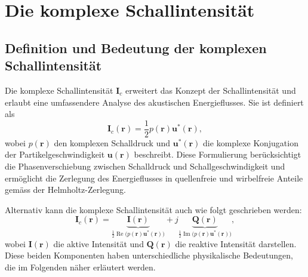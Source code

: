%
%
%
%
\section{Die komplexe Schallintensität
\label{helmholtz:section:Schallintensitaet}}

\subsection{Definition und Bedeutung der komplexen Schallintensität
\label{helmholtz:subsection:def_Schallintensitaet}}

Die komplexe Schallintensität $\boldsymbol{I}_c$ erweitert das
Konzept der Schallintensität und erlaubt eine umfassendere Analyse
des akustischen Energieflusses.
Sie ist definiert als
\begin{equation}
\boldsymbol{I}_c (\boldsymbol{r})
=
\frac{1}{2} p(\boldsymbol{r}) \boldsymbol{u}^{*}(\boldsymbol{r}),
\label{helmholtz:equationIntensitaetKomplex}
\end{equation}
wobei $p(\boldsymbol{r})$ den komplexen Schalldruck und
$\boldsymbol{u}^{*}(\boldsymbol{r})$ die komplexe Konjugation der
Partikelgeschwindigkeit $\boldsymbol{u}(\boldsymbol{r})$ beschreibt.
Diese Formulierung berücksichtigt die Phasenverschiebung zwischen
Schalldruck und Schallgeschwindigkeit und ermöglicht die Zerlegung
des Energieflusses in quellenfreie und wirbelfreie Anteile gemäss
der Helmholtz-Zerlegung.

Alternativ kann die komplexe Schallintensität auch wie folgt geschrieben werden:
\begin{equation}
\boldsymbol{I}_c (\boldsymbol{r})
=
\underbrace{
\boldsymbol{I}(\boldsymbol{r})
}_{
\displaystyle
\frac{1}{2}
\operatorname{Re}
\bigl( p(\boldsymbol{r}) \boldsymbol{u}^*(\boldsymbol{r}) \bigr)
}
+
j
\underbrace{
\displaystyle
\boldsymbol{Q}(\boldsymbol{r})
}_{
\frac{1}{2}
\operatorname{Im}
\bigl( p(\boldsymbol{r}) \boldsymbol{u}^*(\boldsymbol{r}) \bigr)
},
\label{helmholtz:equationIntensitaetKomplex_2}
\end{equation}  
wobei $\boldsymbol{I}(\boldsymbol{r})$ die aktive Intensität und
$\boldsymbol{Q}(\boldsymbol{r})$ die reaktive Intensität darstellen.
Diese beiden Komponenten haben unterschiedliche physikalische
Bedeutungen, die im Folgenden näher erläutert werden.


